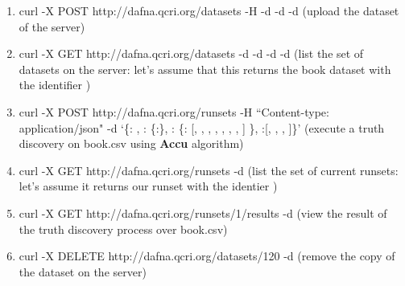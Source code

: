 \documentclass[a4paper,10pt]{scrartcl}
\begin{document}
\begin{enumerate}
 \item curl -X POST http://dafna.qcri.org/datasets -H   
  -d  -d  -d  (upload the dataset of the server)
 \item curl -X GET http://dafna.qcri.org/datasets -d  -d  -d  
 -d  (list the set of datasets on the server: let's assume that this returns the book dataset with the identifier \textbf{})
 \item curl -X POST http://dafna.qcri.org/runsets -H ``Content-type: application/json" -d `\{: , : \{:\}, : \{: [, , , , , , , ] \}, :[, , , ]\}' 
(execute a truth discovery on book.csv using \textbf{Accu} algorithm)
 \item  curl -X GET http://dafna.qcri.org/runsets -d  (list the set of current runsets: let's assume it returns our runset with the identier \textbf{})
\item curl -X GET http://dafna.qcri.org/runsets/1/results -d  (view the result of the truth discovery process over book.csv)
\item curl -X DELETE http://dafna.qcri.org/datasets/120 -d  (remove the copy of the dataset on the server)
 \end{enumerate}

\end{document}
